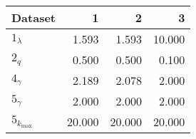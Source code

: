\begin{tabular}{lrrr}
\toprule
 Dataset        &      1 &      2 &      3 \\
\midrule
 $1_{\lambda}$  &  \num{1.593} &  \num{1.593} & \num{10.000} \\
 $2_{q}$        &  \num{0.500} &  \num{0.500} &  \num{0.100} \\
 $4_{\gamma}$   &  \num{2.189} &  \num{2.078} &  \num{2.000} \\
 $5_{\gamma}$   &  \num{2.000} &  \num{2.000} &  \num{2.000} \\
 $5_{k_{\max}}$ & \num{20.000} & \num{20.000} & \num{20.000} \\
\bottomrule
\end{tabular}
